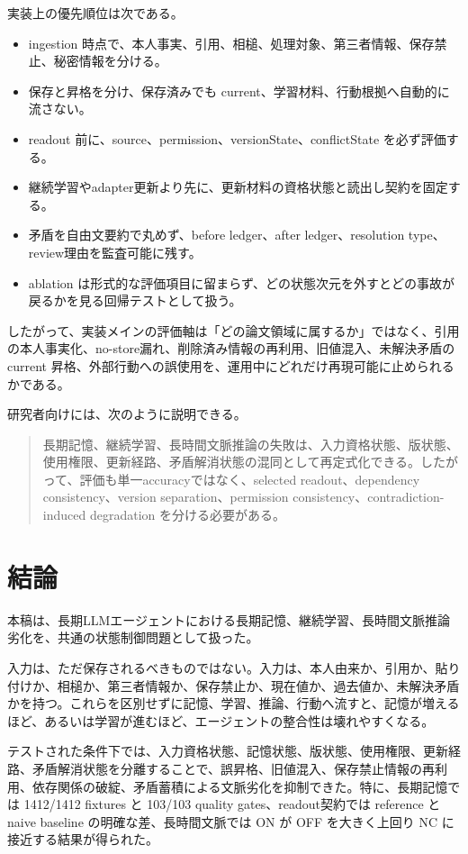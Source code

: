 \documentclass[12pt,a4paper]{article}
\begin{document}
実装上の優先順位は次である。

\begin{itemize}
\tightlist
\item
  ingestion 時点で、本人事実、引用、相槌、処理対象、第三者情報、保存禁止、秘密情報を分ける。
\item
  保存と昇格を分け、保存済みでも current、学習材料、行動根拠へ自動的に流さない。
\item
  readout 前に、source、permission、versionState、conflictState を必ず評価する。
\item
  継続学習やadapter更新より先に、更新材料の資格状態と読出し契約を固定する。
\item
  矛盾を自由文要約で丸めず、before ledger、after ledger、resolution type、review理由を監査可能に残す。
\item
  ablation は形式的な評価項目に留まらず、どの状態次元を外すとどの事故が戻るかを見る回帰テストとして扱う。
\end{itemize}

したがって、実装メインの評価軸は「どの論文領域に属するか」ではなく、引用の本人事実化、no-store漏れ、削除済み情報の再利用、旧値混入、未解決矛盾の current 昇格、外部行動への誤使用を、運用中にどれだけ再現可能に止められるかである。

研究者向けには、次のように説明できる。

\begin{quote}
長期記憶、継続学習、長時間文脈推論の失敗は、入力資格状態、版状態、使用権限、更新経路、矛盾解消状態の混同として再定式化できる。したがって、評価も単一accuracyではなく、selected readout、dependency consistency、version separation、permission consistency、contradiction-induced degradation を分ける必要がある。
\end{quote}

\section{結論}\label{ux7d50ux8ad6}

本稿は、長期LLMエージェントにおける長期記憶、継続学習、長時間文脈推論劣化を、共通の状態制御問題として扱った。

入力は、ただ保存されるべきものではない。入力は、本人由来か、引用か、貼り付けか、相槌か、第三者情報か、保存禁止か、現在値か、過去値か、未解決矛盾かを持つ。これらを区別せずに記憶、学習、推論、行動へ流すと、記憶が増えるほど、あるいは学習が進むほど、エージェントの整合性は壊れやすくなる。

テストされた条件下では、入力資格状態、記憶状態、版状態、使用権限、更新経路、矛盾解消状態を分離することで、誤昇格、旧値混入、保存禁止情報の再利用、依存関係の破綻、矛盾蓄積による文脈劣化を抑制できた。特に、長期記憶では 1412/1412 fixtures と 103/103 quality gates、readout契約では reference と naive baseline の明確な差、長時間文脈では ON が OFF を大きく上回り NC に接近する結果が得られた。
\end{document}
